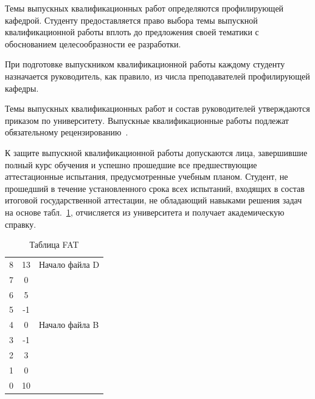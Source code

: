 \documentclass[14pt]{extarticle} %
\begin{document}



Темы выпускных квалификационных работ определяются профилирующей кафедрой. 
Студенту предоставляется право выбора темы выпускной квалификационной работы 
вплоть до предложения своей тематики с обоснованием целесообразности ее разработки.


При подготовке выпускником квалификационной работы каждому студенту назначается 
руководитель, как правило, из числа преподавателей профилирующей кафедры.

Темы выпускных квалификационных работ и состав руководителей утверждаются приказом 
по университету. Выпускные квалификационные работы подлежат обязательному 
рецензированию~\cite{Kaz11,Bal19,gostMagma,lawEdu}. 


К защите выпускной квалификационной работы допускаются лица, завершившие полный курс 
обучения и успешно прошедшие все предшествующие аттестационные испытания, 
предусмотренные учебным планом. Студент, не прошедший в течение установленного 
срока всех испытаний, входящих в состав итоговой государственной аттестации, не обладающий навыками решения задач на основе табл.~\ref{t1}, 
отчисляется из университета и получает академическую справку.

\begin{table}[h]
\centering
\caption{Таблица FAT}
\label{t1}
\begin{tabular}{r|c|l|}
\cline{2-3}
 8 & 13 & Начало файла D  \\ \cline{2-3}
 7 &  0 &   \\ \cline{2-3}
 6 &  5 &   \\ \cline{2-3}
 5 & -1 &   \\ \cline{2-3}
 4 &  0 & Начало файла B  \\ \cline{2-3}
 3 & -1 &   \\ \cline{2-3}
 2 &  3 &   \\ \cline{2-3}
 1 &  0 &   \\ \cline{2-3}
 0 & 10 &   \\ \cline{2-3}
\end{tabular}
\end{table}
\end{document}
